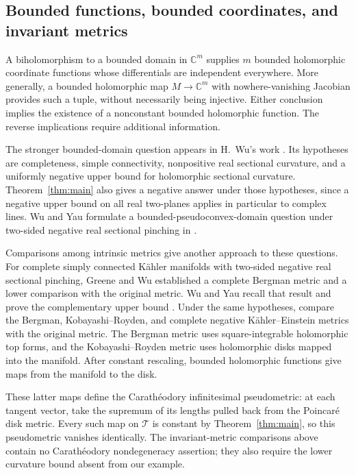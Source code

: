 \subsection{Bounded functions, bounded coordinates, and invariant metrics}

A biholomorphism to a bounded domain in $\mathbb C^m$ supplies $m$
bounded holomorphic coordinate functions whose differentials are
independent everywhere. More generally, a bounded holomorphic map
$M\to\mathbb C^m$ with nowhere-vanishing Jacobian provides such a tuple,
without necessarily being injective. Either conclusion implies the
existence of a nonconstant bounded holomorphic function. The reverse
implications require additional information.

The stronger bounded-domain question appears in H.~Wu's work
\citep[p.~195, question~(1)]{WuNormal1967}. Its hypotheses are
completeness, simple connectivity, nonpositive real sectional curvature,
and a uniformly negative upper bound for holomorphic sectional
curvature. Theorem~\ref{thm:main} also gives a negative answer under
those hypotheses, since a negative upper bound on all real two-planes
applies in particular to complex lines. Wu and Yau formulate a
bounded-pseudoconvex-domain question under two-sided negative real
sectional pinching in \citep[Conjecture~4.3]{WuYauSurvey2019}.

Comparisons among intrinsic metrics give another approach to these
questions. For complete simply connected K\"ahler manifolds with
two-sided negative real sectional pinching, Greene and Wu established
a complete Bergman metric and a lower comparison with the original
metric. Wu and Yau recall that result and prove the complementary upper
bound \citep[Theorems~4 and~6]{WuYau2020}. Under the same hypotheses,
\citet[Corollary~7]{WuYau2020} compare the Bergman,
Kobayashi--Royden, and complete negative K\"ahler--Einstein metrics with
the original metric. The Bergman metric uses square-integrable
holomorphic top forms, and the Kobayashi--Royden metric uses holomorphic
disks mapped into the manifold. After constant rescaling, bounded
holomorphic functions give maps from the manifold to the disk.

These latter maps define the Carath\'eodory infinitesimal pseudometric:
at each tangent vector, take the supremum of its lengths pulled back
from the Poincar\'e disk metric. Every such map on $\mathcal T$ is constant by
Theorem~\ref{thm:main}, so this pseudometric vanishes identically.
The invariant-metric comparisons above contain no Carath\'eodory
nondegeneracy assertion; they also require the lower curvature bound
absent from our example.

